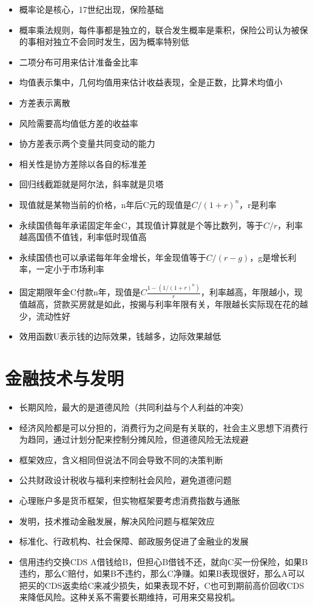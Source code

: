 \documentclass[]{book}
\providecommand{\tightlist}{%
  \setlength{\itemsep}{0pt}\setlength{\parskip}{0pt}}
\begin{document}
\begin{itemize}
\tightlist
\item
  概率论是核心，17世纪出现，保险基础
\item
  概率乘法规则，每件事都是独立的，联合发生概率是乘积，保险公司认为被保的事相对独立不会同时发生，因为概率特别低
\item
  二项分布可用来估计准备金比率
\item
  均值表示集中，几何均值用来估计收益表现，全是正数，比算术均值小
\item
  方差表示离散
\item
  风险需要高均值低方差的收益率
\item
  协方差表示两个变量共同变动的能力
\item
  相关性是协方差除以各自的标准差
\item
  回归线截距就是阿尔法，斜率就是贝塔
\item
  现值就是某物当前的价格，n年后C元的现值是\(C/(1+r)^n\)，r是利率
\item
  永续国债每年承诺固定年金C，其现值计算就是个等比数列，等于\(C/r\)，利率越高国债不值钱，利率低时现值高
\item
  永续国债也可以承诺每年年金增长，年金现值等于\(C/(r-g)\)，g是增长利率，一定小于市场利率
\item
  固定期限年金C付款n年，现值是\(C\frac{1-(1/(1+r)^n)}{r}\)，利率越高，年限越小，现值越高，贷款买房就是如此，按揭与利率年限有关，年限越长实际现在花的越少，流动性好
\item
  效用函数U表示钱的边际效果，钱越多，边际效果越低
\end{itemize}

\hypertarget{ux91d1ux878dux6280ux672fux4e0eux53d1ux660e}{%
\section{金融技术与发明}\label{ux91d1ux878dux6280ux672fux4e0eux53d1ux660e}}

\begin{itemize}
\tightlist
\item
  长期风险，最大的是道德风险（共同利益与个人利益的冲突）
\item
  经济风险都是可以分担的，消费行为之间是有关联的，社会主义思想下消费行为趋同，通过计划分配来控制分摊风险，但道德风险无法规避
\item
  框架效应，含义相同但说法不同会导致不同的决策判断
\item
  公共财政设计税收与福利来控制社会风险，避免道德问题
\item
  心理账户多是货币框架，但实物框架要考虑消费指数与通胀
\item
  发明，技术推动金融发展，解决风险问题与框架效应
\item
  标准化、行政机构、社会保障、邮政服务促进了金融业的发展
\item
  信用违约交换CDS A借钱给B，但担心B借钱不还，就向C买一份保险，如果B违约，那么C赔付，如果B不违约，那么C净赚。如果B表现很好，那么A可以把买的CDS返卖给C来减少损失，如果表现不好，C也可到期前高价回收CDS来降低风险。这种关系不需要长期维持，可用来交易投机。
\end{itemize}
\end{document}
